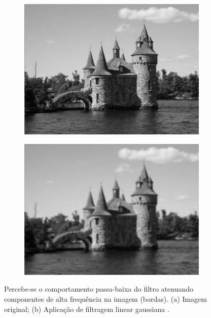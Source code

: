 \begin{figure}[ht]
  \begin{center}
    \begin{subfigure}[b]{.49\textwidth}
      \begin{center}
        \includegraphics[width=.9\linewidth]{imgs/castelo_original.png}
      \end{center}
      \caption{}
      \label{fig:castelo_orig}
    \end{subfigure}
    \begin{subfigure}[b]{.49\textwidth}
      \begin{center}
        \includegraphics[width=.9\linewidth]{imgs/castelo_gaussiano.png}
      \end{center}
      \caption{}
      \label{fig:castelo_gauss}
    \end{subfigure}
  \end{center}
  \caption{Percebe-se o comportamento passa-baixa do filtro atenuando componentes de alta frequência na imagem (bordas). (a) Imagem original; (b) Aplicação de filtragem linear gaussiana \citep{opencv2:2011:book}.}
  \label{fig:filtro_gaussiano}
\end{figure}

